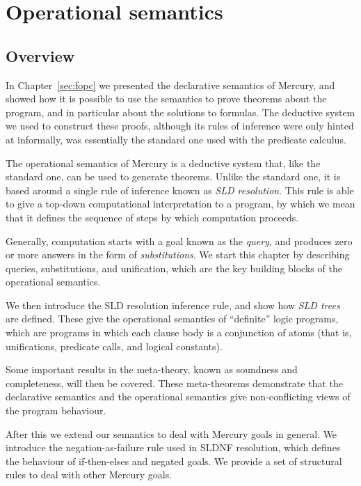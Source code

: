 \chapter{Operational semantics}
\label{sec:op-sem}

\section{Overview}

In Chapter~\ref{sec:fopc}
we presented the declarative semantics of Mercury,
and showed how it is possible to use the semantics
to prove theorems about the program,
and in particular about the solutions to formulas.
The deductive system we used to construct these proofs,
although its rules of inference were only hinted at informally,
was essentially the standard one
used with the predicate calculus.

The operational semantics of Mercury
is a deductive system that,
like the standard one,
can be used to generate theorems.
Unlike the standard one,
it is based around a single rule of inference
known as \emph{SLD resolution}.
This rule is able to give a top-down
computational interpretation to a program,
by which we mean that it
defines the sequence of steps by which computation proceeds.

Generally,
computation starts with a goal known as the \emph{query},
and produces zero or more answers in the form of \emph{substitutions}.
We start this chapter by describing queries, substitutions, and unification,
which are the key building blocks of the operational semantics.

We then introduce the SLD resolution inference rule,
and show how \emph{SLD trees} are defined.
These give the operational semantics
of ``definite\label{gi:definite}'' logic programs,
which are programs in which each clause body
is a conjunction of atoms\label{gi:atom3}
(that is, unifications, predicate calls, and logical constants).

Some important results in the meta-theory,
known as soundness and completeness,
will then be covered.
These meta-theorems demonstrate that
the declarative semantics and the operational semantics
give non-conflicting views of the program behaviour.

After this we extend our semantics to deal with Mercury goals in general.
We introduce the negation-as-failure rule used in SLDNF resolution,
which defines the behaviour of if-then-elses and negated goals.
We provide a set of structural rules to deal with
other Mercury goals.

